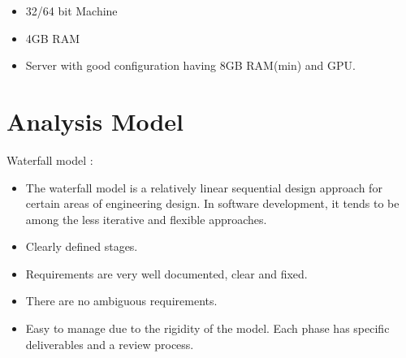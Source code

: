 \documentclass[oneside,a4paper,12pt]{book}
\begin{document}
\setlength{\parskip}{0.0pt}
\begin{itemize}
	\item 32/64 bit Machine\par

	\item 4GB RAM\par

\setlength{\parskip}{9.96pt}
	\item Server with good configuration having 8GB RAM(min) and GPU.
\end{itemize}\par


\newpage

\section{Analysis Model}

\begin{justify}
Waterfall model :
\end{justify}\par

\setlength{\parskip}{0.0pt}
\begin{itemize}
	\item The waterfall model is a relatively linear sequential design approach for certain areas of engineering design. In software development, it tends to be among the less iterative and flexible approaches.\par

	\item Clearly defined stages.\par

	\item Requirements are very well documented, clear and fixed.\par

	\item There are no ambiguous requirements.\par

	\item Easy to manage due to the rigidity of the model. Each phase has specific deliverables and a review process.\par
\end{itemize}
\end{document}
